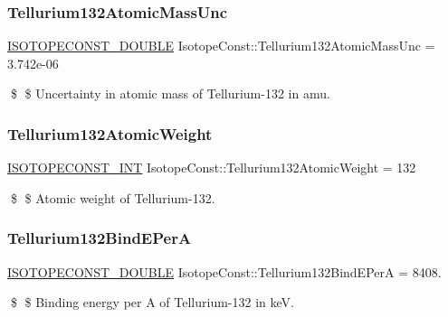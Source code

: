 \subsubsection{\texorpdfstring{Tellurium132\+Atomic\+Mass\+Unc}{Tellurium132AtomicMassUnc}}
{\footnotesize\ttfamily \mbox{\hyperlink{group___isotope_const-_macros_ga8f45a7272ce02c0b4c65c44636ed719a}{I\+S\+O\+T\+O\+P\+E\+C\+O\+N\+S\+T\+\_\+\+D\+O\+U\+B\+LE}} Isotope\+Const\+::\+Tellurium132\+Atomic\+Mass\+Unc = 3.\+742e-\/06}

\$ \$ Uncertainty in atomic mass of Tellurium-\/132 in amu. \mbox{\label{group___isotope_const-_tellurium-_te132_ga73a0da92aa12ca67033b6f66eb587bd5}} 
\subsubsection{\texorpdfstring{Tellurium132\+Atomic\+Weight}{Tellurium132AtomicWeight}}
{\footnotesize\ttfamily \mbox{\hyperlink{group___isotope_const-_macros_ga5f18360b3e99483a35c32d789e62621c}{I\+S\+O\+T\+O\+P\+E\+C\+O\+N\+S\+T\+\_\+\+I\+NT}} Isotope\+Const\+::\+Tellurium132\+Atomic\+Weight = 132}

\$ \$ Atomic weight of Tellurium-\/132. \mbox{\label{group___isotope_const-_tellurium-_te132_ga8c631e1e1fa08cb03674899b35156b47}} 
\subsubsection{\texorpdfstring{Tellurium132\+Bind\+E\+PerA}{Tellurium132BindEPerA}}
{\footnotesize\ttfamily \mbox{\hyperlink{group___isotope_const-_macros_ga8f45a7272ce02c0b4c65c44636ed719a}{I\+S\+O\+T\+O\+P\+E\+C\+O\+N\+S\+T\+\_\+\+D\+O\+U\+B\+LE}} Isotope\+Const\+::\+Tellurium132\+Bind\+E\+PerA = 8408.}

\$ \$ Binding energy per A of Tellurium-\/132 in keV. \mbox{\label{group___isotope_const-_tellurium-_te132_gac43e192021bd6563b7c7440a072d539d}} 
